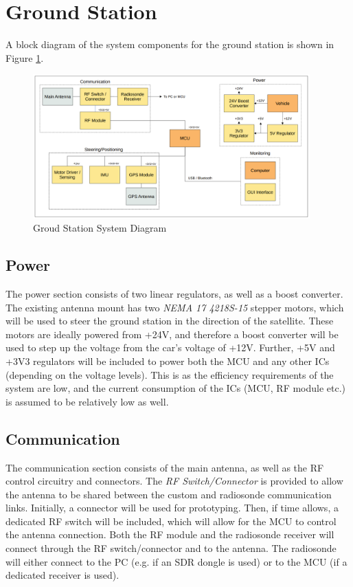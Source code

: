 \graphicspath{{./figures}}

\section{Ground Station}
A block diagram of the system components for the ground station is shown in Figure \ref{fig:gs_system}.

\begin{figure}[!htb]
  \centering
  \includegraphics[width=0.95\textwidth]{gs_system}
  \caption{Groud Station System Diagram}
  \label{fig:gs_system}
\end{figure}

\subsection{Power}
The power section consists of two linear regulators, as well as a boost converter. The existing antenna mount has two \textit{NEMA 17 4218S-15} stepper motors, which will be used to steer the ground station in the direction of the satellite. These motors are ideally powered from +24V, and therefore a boost converter will be used to step up the voltage from the car's voltage of +12V. Further, +5V and +3V3 regulators will be included to power both the MCU and any other ICs (depending on the voltage levels). This is as the efficiency requirements of the system are low, and the current consumption of the ICs (MCU, RF module etc.) is assumed to be relatively low as well.

\subsection{Communication}
The communication section consists of the main antenna, as well as the RF control circuitry and connectors. The \textit{RF Switch/Connector} is provided to allow the antenna to be shared between the custom and radiosonde communication links. Initially, a connector will be used for prototyping. Then, if time allows, a dedicated RF switch will be included, which will allow for the MCU to control the antenna connection. Both the RF module and the radiosonde receiver will connect through the RF switch/connector and to the antenna. The radiosonde will either connect to the PC (e.g. if an SDR dongle is used) or to the MCU (if a dedicated receiver is used).

